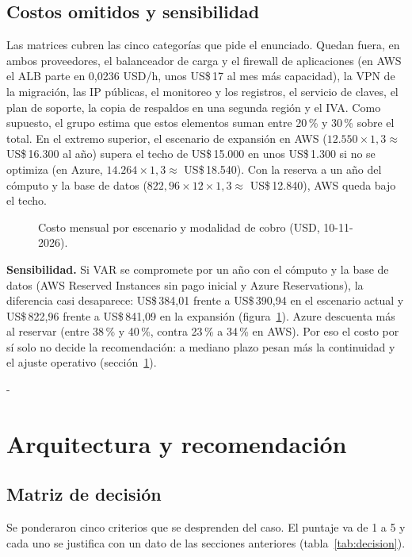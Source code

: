 \documentclass[11pt,letterpaper]{article}
\makeatletter
\newcommand{\needspace}[1]{\par\penalty-100\begingroup\setlength{\dimen@}{#1}%
  \dimen@ii\pagegoal\advance\dimen@ii-\pagetotal
  \ifdim\dimen@>\dimen@ii\ifdim\dimen@ii>\z@\vfil\fi\break\fi\endgroup}
\newcommand{\usd}[1]{US\$\,#1}
\makeatother
\begin{document}
\subsection{Costos omitidos y sensibilidad}\label{sec:omitidos}
Las matrices cubren las cinco categorías que pide el enunciado. Quedan fuera, en ambos proveedores, el balanceador de carga y el firewall de aplicaciones (en AWS el ALB parte en 0,0236 USD/h, unos \usd{17} al mes más capacidad), la VPN de la migración, las IP públicas, el monitoreo y los registros, el servicio de claves, el plan de soporte, la copia de respaldos en una segunda región y el IVA. Como supuesto, el grupo estima que estos elementos suman entre 20\,\% y 30\,\% sobre el total. En el extremo superior, el escenario de expansión en AWS (\(12.550 \times 1{,}3 \approx\) \usd{16.300} al año) supera el techo de \usd{15.000} en unos \usd{1.300} si no se optimiza (en Azure, \(14.264 \times 1{,}3 \approx\) \usd{18.540}). Con la reserva a un año del cómputo y la base de datos (\(822{,}96 \times 12 \times 1{,}3 \approx\) \usd{12.840}), AWS queda bajo el techo.

\begin{figure}[htbp]
\centering

\caption{Costo mensual por escenario y modalidad de cobro (USD, 10-11-2026).}\label{fig:costos}
\end{figure}

\textbf{Sensibilidad.} Si VAR se compromete por un año con el cómputo y la base de datos (AWS Reserved Instances sin pago inicial y Azure Reservations), la diferencia casi desaparece: \usd{384,01} frente a \usd{390,94} en el escenario actual y \usd{822,96} frente a \usd{841,09} en la expansión (figura~\ref{fig:costos}). Azure descuenta más al reservar (entre 38\,\% y 40\,\%, contra 23\,\% a 34\,\% en AWS). Por eso el costo por sí solo no decide la recomendación: a mediano plazo pesan más la continuidad y el ajuste operativo (sección~\ref{sec:recomendacion}).

\needspace{8\baselineskip}
\section{Arquitectura y recomendación}\label{sec:recomendacion}
\subsection{Matriz de decisión}
Se ponderaron cinco criterios que se desprenden del caso. El puntaje va de 1 a 5 y cada uno se justifica con un dato de las secciones anteriores (tabla~\ref{tab:decision}).
\end{document}
